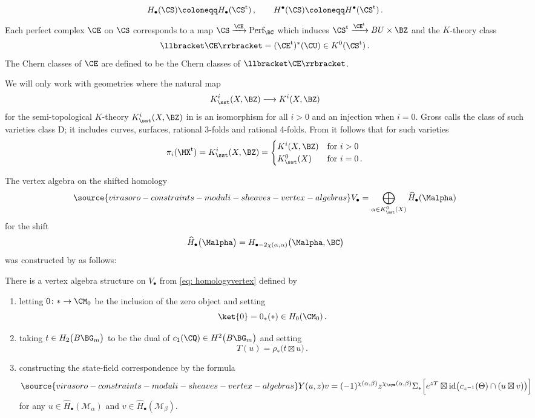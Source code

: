 $$
H_\bullet(\CS) \coloneqq H_\bullet(\CS^{\text{t}})\, ,\qquad H^\bullet(\CS)\coloneqq H^\bullet(\CS^{\text{t}})\,.
$$
Each perfect complex $\CE$ on $\CS$ corresponds to a map
$
\CS\xrightarrow{\CE} \text{Perf}_{\BC}
$ which induces $\CS^{\text{t}}\xrightarrow{\CE^\text{t}}BU\times \BZ$ and the $K$-theory class
$$
\llbracket \CE \rrbracket= (\CE^{\text{t}})^*(\CU) \in K^0(\CS^{\text{t}})\,.
$$
The Chern classes of $\CE$ are defined to be the Chern classes of $\llbracket \CE\rrbracket$.
\begin{remark}
\notready\label{rem: classD}
  We will only work with geometries where the natural map
    $$
    K^i_{\sst}(X, \BZ)\longrightarrow K^i(X, \BZ)
    $$
    for the semi-topological $K$-theory $K^i_{\sst}(X, \BZ)$ in \cite{FW} is an isomorphism for all $i>0$ and an injection when $i=0$. Gross \cite{Gr19} calls the class of such varieties class D; it includes curves, surfaces, rational 3-folds and rational 4-folds. From \cite[Theorem 4.21]{B16} it follows that for such varieties
    $$
    \pi_i(\MX^\text{t}) = K^i_{\sst}(X,\BZ)=\begin{cases}K^i(X, \BZ)&\textup{for }i>0\\
    K_\sst^0(X)&\textup{for }i=0\,.\end{cases}
    $$
\end{remark}
The vertex algebra on the shifted homology
\begin{equation}
\label{eq: homologyvertex}
\source{virasoro-constraints-moduli-sheaves-vertex-algebras}
V_\bullet = \bigoplus_{\alpha\in K_\sst^0(X)}\widehat{H}_\bullet(\Malpha)
\end{equation}
for the shift
$$
\widehat{H}_\bullet\big(\Malpha\big)= H_{\bullet-2\chi(\alpha,\alpha)}\big(\Malpha,\BC\big)
$$
was constructed by \cite{Jo17} as follows:
\begin{theorem}[{\cite[Theorem 3.12]{Jo17}}]
\notready\label{thm: geometricvaconstruction}
There is a vertex algebra structure on $V_\bullet$ from \eqref{eq: homologyvertex} defined by
\begin{enumerate}
    \item letting $0\colon*\to \CM_0$ be the inclusion of the zero object and setting
    $$
    \ket{0}=0_*(*)\in H_0(\CM_0)\,.
    $$
    \item taking $t\in H_2\big(B\BG_m\big)$ to be the dual of $c_1(\CQ)\in H^2\big(B\BG_m\big)$ and setting
    $$
    T(u) = \rho_\ast\big(t\boxtimes u\big)\,.
    $$
    \item constructing the state-field correspondence by the formula
    \begin{equation}\label{eq: joycefields}
\source{virasoro-constraints-moduli-sheaves-vertex-algebras}
    Y(u,z)v = (-1)^{\chi(\alpha,\beta)}z^{\chi_\sym(\alpha,\beta)}\Sigma_\ast\Big[e^{zT}\boxtimes \text{id}\big(c_{z^{-1}}(\Theta)\cap (u\boxtimes v)\big)\Big]
    \end{equation}
for any $u\in \widehat{H}_\bullet(\mathcal{M}_\alpha)$ and $v\in \widehat{H}_\bullet(\mathcal{M}_{\beta})$.
\end{enumerate}
\end{theorem}


